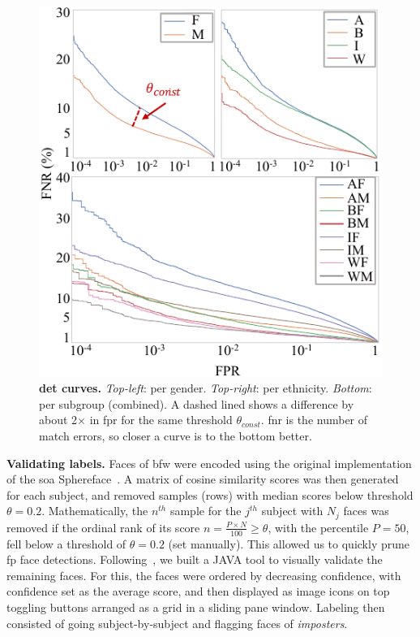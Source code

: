 \begin{figure}[!t] 
	\centering    
	\includegraphics[width=\linewidth]{figures/detcurve-improved.pdf}
		\caption{\textbf{\gls{det} curves.} \emph{Top-left}: per gender. \emph{Top-right}: per ethnicity. \emph{Bottom}: per subgroup (\ie combined). A dashed lined shows a difference by about 2$\times$ in \gls{fpr} for the same threshold $\theta_{const}$. \gls{fnr} is the number of match errors, so closer a curve is to the bottom better.}
\label{fig:detcurves} 
\end{figure} 

\vspace{1mm}
\noindent\textbf{Validating labels.} 
Faces of \gls{bfw} were encoded using the original implementation of the \gls{soa} Sphereface~\cite{liu2017sphereface}. A matrix of cosine similarity scores was then generated for each subject, and removed samples (\ie rows) with median scores below threshold $\theta=0.2$. Mathematically, the $n^{th}$ sample for the $j^{th}$ subject with $N_j$ faces was removed if the ordinal rank of its score $n = \frac{P\times N}{100}\geq\theta$, with the percentile $P=50$, fell below a threshold of $\theta=0.2$ (set manually). This allowed us to quickly prune \gls{fp} face detections. Following~\cite{robinson2016families, robinson2018visual}, we built a JAVA tool to visually validate the remaining faces. For this, the faces were ordered by decreasing confidence, with confidence set as the average score, and then displayed as image icons on top toggling buttons arranged as a grid in a sliding pane window. Labeling then consisted of going subject-by-subject and flagging faces of \emph{imposters}.



